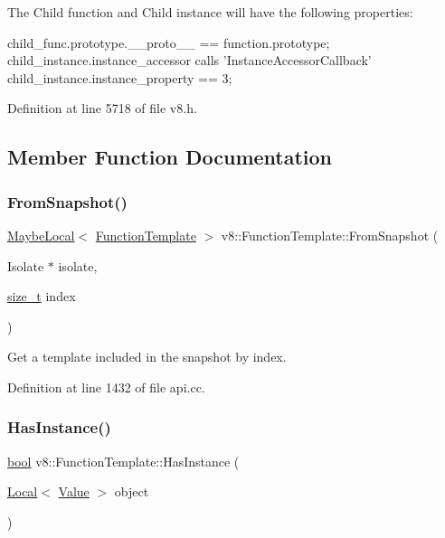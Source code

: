 The Child function and Child instance will have the following properties\+:


\begin{DoxyCode}
child\_func.prototype.\_\_proto\_\_ == \textcolor{keyword}{function}.prototype;
child\_instance.instance\_accessor calls \textcolor{stringliteral}{'InstanceAccessorCallback'}
child\_instance.instance\_property == 3;
\end{DoxyCode}
 

Definition at line 5718 of file v8.\+h.



\subsection{Member Function Documentation}
\mbox{\label{classv8_1_1FunctionTemplate_ac2ac00c5547ff4d39c14f892c043e3ec}} 
\subsubsection{\texorpdfstring{From\+Snapshot()}{FromSnapshot()}}
{\footnotesize\ttfamily \mbox{\hyperlink{classv8_1_1MaybeLocal}{Maybe\+Local}}$<$ \mbox{\hyperlink{classv8_1_1FunctionTemplate}{Function\+Template}} $>$ v8\+::\+Function\+Template\+::\+From\+Snapshot (\begin{DoxyParamCaption}\item[{Isolate $\ast$}]{isolate,  }\item[{\mbox{\hyperlink{classsize__t}{size\+\_\+t}}}]{index }\end{DoxyParamCaption})\hspace{0.3cm}{\ttfamily [static]}}

Get a template included in the snapshot by index. 

Definition at line 1432 of file api.\+cc.

\mbox{\label{classv8_1_1FunctionTemplate_a90d838f3456d300bd19d2a2cb98645bd}} 
\subsubsection{\texorpdfstring{Has\+Instance()}{HasInstance()}}
{\footnotesize\ttfamily \mbox{\hyperlink{classbool}{bool}} v8\+::\+Function\+Template\+::\+Has\+Instance (\begin{DoxyParamCaption}\item[{\mbox{\hyperlink{classv8_1_1Local}{Local}}$<$ \mbox{\hyperlink{classv8_1_1Value}{Value}} $>$}]{object }\end{DoxyParamCaption})}


